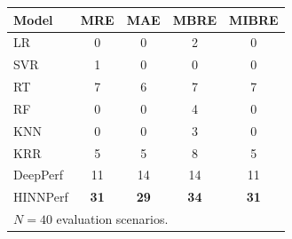 \begin{tabular}{lcccc}
\toprule
Model & MRE & MAE & MBRE & MIBRE \\
\midrule
LR & 0 & 0 & 2 & 0 \\
SVR & 1 & 0 & 0 & 0 \\
RT & 7 & 6 & 7 & 7 \\
RF & 0 & 0 & 4 & 0 \\
KNN & 0 & 0 & 3 & 0 \\
KRR & 5 & 5 & 8 & 5 \\
DeepPerf & 11 & 14 & 14 & 11 \\
HINNPerf & \textbf{31} & \textbf{29} & \textbf{34} & \textbf{31} \\
\midrule
\multicolumn{5}{l}{\footnotesize $N=40$ evaluation scenarios.} \\
\bottomrule
\end{tabular}
